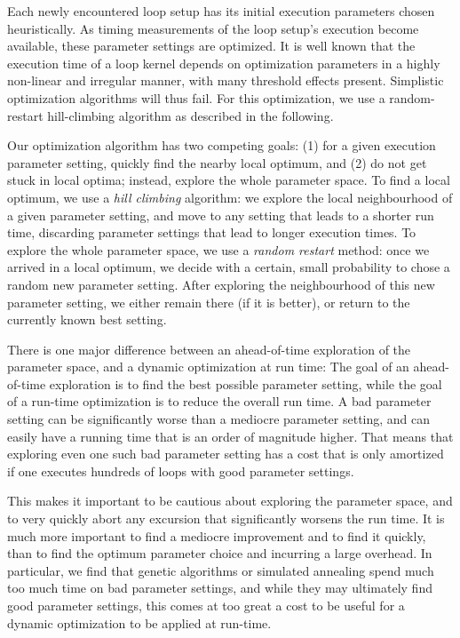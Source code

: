 \documentclass[conference]{IEEEtran}
\begin{document}
Each newly encountered loop setup has its initial execution parameters
chosen heuristically. As timing measurements of the loop setup's
execution become available, these parameter settings are optimized. It
is well known that the execution time of a loop kernel depends on
optimization parameters in a highly non-linear and irregular manner,
with many threshold effects present.
Simplistic optimization algorithms will thus fail. For this
optimization, we use a random-restart hill-climbing algorithm
as described in the following.

Our optimization algorithm has two competing goals: (1) for a given
execution parameter setting, quickly find the nearby local optimum,
and (2) do not get stuck in local optima; instead, explore the whole
parameter space. To find a local optimum, we use a \emph{hill
  climbing} algorithm: we explore the local neighbourhood of a given
parameter setting, and move to any setting that leads to a shorter run
time, discarding parameter settings that lead to longer execution
times. To explore the whole parameter space, we use a \emph{random
  restart} method: once we arrived in a local optimum, we decide with
a certain, small probability to chose a random new parameter setting. After
exploring the neighbourhood of this new parameter setting, we either
remain there (if it is better), or return to the currently known
best setting.

There is one major difference between an ahead-of-time exploration of
the parameter space, and a dynamic optimization at run time: The goal
of an ahead-of-time exploration is to find the best possible parameter
setting, while the goal of a run-time optimization is to reduce the
overall run time. A bad parameter setting can be significantly worse
than a mediocre parameter setting, and can easily have a running time that
is an order of magnitude higher. That means that exploring even one
such bad parameter setting has a cost that is only amortized if one
executes hundreds of loops with good parameter settings.

This makes it important to be cautious about exploring the
parameter space, and to very quickly abort any excursion that
significantly worsens the run time. It is much more important to find
a mediocre improvement and to find it quickly, than to find the optimum
parameter choice and incurring a large overhead. In
particular, we find that genetic algorithms or simulated annealing
spend much too much time on bad parameter settings, and while they may
ultimately find good parameter settings, this comes at too great a
cost to be useful for a dynamic optimization to be applied at
run-time.
\end{document}
